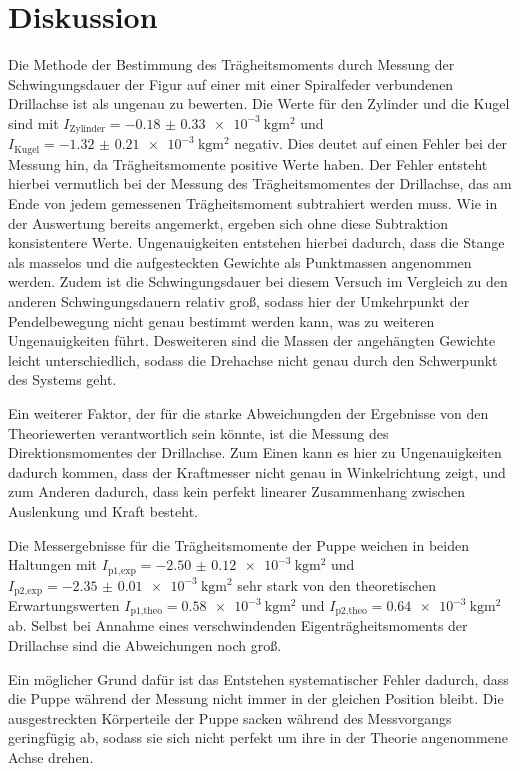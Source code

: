 \newpage
\section{Diskussion}
\label{sec:Diskussion}

Die Methode der Bestimmung des Trägheitsmoments durch Messung der Schwingungsdauer
der Figur auf einer mit einer Spiralfeder verbundenen Drillachse ist als ungenau
zu bewerten.
Die Werte für den Zylinder und die Kugel sind mit $I_{\text{Zylinder}} = \SI{-0.18(033)e-3}{\kilogram\meter\squared}$
und $I_{\text{Kugel}}=\SI{-1.32(021)e-3}{\kilogram\meter\squared}$ negativ. Dies
deutet auf einen Fehler bei der Messung hin, da Trägheitsmomente positive Werte haben. Der Fehler entsteht
hierbei vermutlich bei der Messung des Trägheitsmomentes der Drillachse, das am Ende
von jedem gemessenen Trägheitsmoment subtrahiert werden muss. Wie in der Auswertung
bereits angemerkt, ergeben sich ohne diese Subtraktion konsistentere Werte. Ungenauigkeiten entstehen
hierbei dadurch, dass die Stange als masselos und die aufgesteckten Gewichte als
Punktmassen angenommen werden. Zudem ist die Schwingungsdauer bei diesem Versuch
im Vergleich zu den anderen Schwingungsdauern relativ groß, sodass hier der Umkehrpunkt
der Pendelbewegung nicht genau bestimmt werden kann, was zu weiteren Ungenauigkeiten führt.
Desweiteren sind die Massen der angehängten Gewichte leicht unterschiedlich, sodass
die Drehachse nicht genau durch den Schwerpunkt des Systems geht.

Ein weiterer Faktor, der für die starke Abweichungden der Ergebnisse von den
Theoriewerten verantwortlich sein könnte, ist die Messung des Direktionsmomentes
der Drillachse. Zum Einen kann es hier zu Ungenauigkeiten dadurch kommen, dass der
Kraftmesser nicht genau in Winkelrichtung zeigt, und zum
Anderen dadurch, dass kein perfekt linearer Zusammenhang zwischen Auslenkung und Kraft
besteht.

Die Messergebnisse für die Trägheitsmomente der Puppe weichen in beiden Haltungen
mit $I_{\text{p1,exp}} = \SI{-2.50(012)e-3}{\kilogram\meter\squared}$ und
$I_{\text{p2,exp}} = \SI{-2.35(001)e-3}{\kilogram\meter\squared}$
sehr stark von den theoretischen Erwartungswerten $I_{\text{p1,theo}} = \SI{0.58e-3}{\kilogram\meter\squared}$
und $I_{\text{p2,theo}} = \SI{0.64e-3}{\kilogram\meter\squared}$ ab. Selbst bei
Annahme eines verschwindenden Eigenträgheitsmoments der Drillachse sind die Abweichungen
noch groß.

Ein möglicher Grund dafür ist das Entstehen systematischer Fehler dadurch,
dass die Puppe während der Messung nicht immer in der gleichen Position bleibt. Die ausgestreckten
Körperteile der Puppe sacken während des Messvorgangs geringfügig ab, sodass sie sich
nicht perfekt um ihre in der Theorie angenommene Achse drehen.

